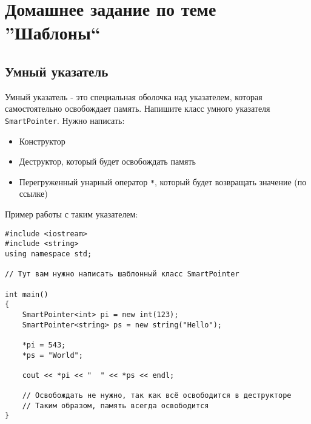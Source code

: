 \documentclass{article}
\begin{document}



\section*{Домашнее задание по теме ''Шаблоны``}
\subsection*{Умный указатель}
Умный указатель - это специальная оболочка над указателем, которая самостоятельно освобождает память. Напишите класс умного указателя \texttt{SmartPointer}. Нужно написать:
\begin{itemize}
\item Конструктор
\item Деструктор, который будет освобождать память
\item Перегруженный унарный оператор \texttt{*}, который будет возвращать значение (по ссылке)
\end{itemize}
Пример работы с таким указателем:
\begin{lstlisting}
#include <iostream>
#include <string> 
using namespace std;

// Тут вам нужно написать шаблонный класс SmartPointer

int main() 
{
    SmartPointer<int> pi = new int(123);
    SmartPointer<string> ps = new string("Hello");
    
    *pi = 543;
    *ps = "World";
    
    cout << *pi << "  " << *ps << endl;
    
    // Освобождать не нужно, так как всё освободится в деструкторе
    // Таким образом, память всегда освободится
}
\end{lstlisting}
\end{document}
